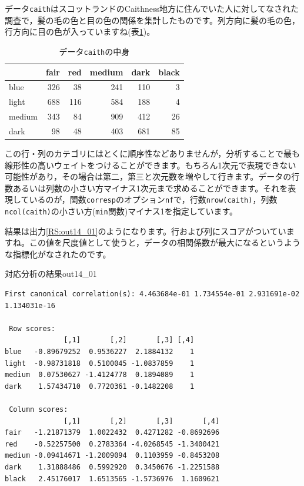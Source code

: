 \documentclass{ltjsbook}
\begin{document}
データ\texttt{caith}はスコットランドのCaithness地方に住んでいた人に対してなされた調査で，髪の毛の色と目の色の関係を集計したものです。列方向に髪の毛の色，行方向に目の色が入っていますね(表\ref{tbl::14_06})。

\begin{table}[h]
    \caption{データ\texttt{caith}の中身}
    \centering
    \begin{tabular}{lrrrrr}
        \hline
               & fair & red & medium & dark & black \\\hline
        \hline
        blue   & 326  & 38  & 241    & 110  & 3     \\
        light  & 688  & 116 & 584    & 188  & 4     \\
        medium & 343  & 84  & 909    & 412  & 26    \\
        dark   & 98   & 48  & 403    & 681  & 85    \\
        \hline
    \end{tabular}
    \label{tbl::14_06}
\end{table}

この行・列のカテゴリにはとくに順序性などありませんが，分析することで最も線形性の高いウェイトをつけることができます。もちろん1次元で表現できない可能性があり，その場合は第二，第三と次元数を増やして行きます。データの行数あるいは列数の小さい方マイナス1次元まで求めることができます。それを表現しているのが，関数\texttt{corresp}のオプション\texttt{nf}で，行数\texttt{nrow(caith)}，列数\texttt{ncol(caith)}の小さい方(\texttt{min}関数)マイナス1を指定しています。

結果は出力\ref{RS:out14_01}のようになります。行および列にスコアがついていますね。この値を尺度値として使うと，データの相関係数が最大になるというような指標化がなされたのです。
\begin{Rscreen}{対応分析の結果}{out14_01}
    \begin{verbatim}
First canonical correlation(s): 4.463684e-01 1.734554e-01 2.931691e-02 1.134031e-16 

 Row scores:
              [,1]       [,2]       [,3] [,4]
blue   -0.89679252  0.9536227  2.1884132    1
light  -0.98731818  0.5100045 -1.0837859    1
medium  0.07530627 -1.4124778  0.1894089    1
dark    1.57434710  0.7720361 -0.1482208    1

 Column scores:
              [,1]       [,2]       [,3]       [,4]
fair   -1.21871379  1.0022432  0.4271282 -0.8692696
red    -0.52257500  0.2783364 -4.0268545 -1.3400421
medium -0.09414671 -1.2009094  0.1103959 -0.8453208
dark    1.31888486  0.5992920  0.3450676 -1.2251588
black   2.45176017  1.6513565 -1.5736976  1.1609621
\end{verbatim}
\end{Rscreen}
\end{document}
